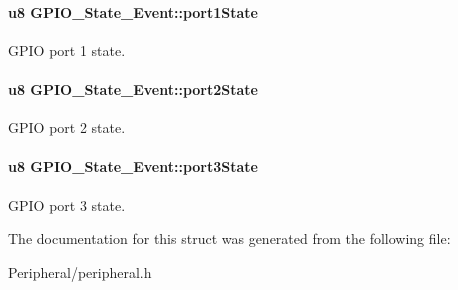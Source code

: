 \paragraph[{\texorpdfstring{port1\+State}{port1State}}]{\setlength{\rightskip}{0pt plus 5cm}u8 G\+P\+I\+O\+\_\+\+State\+\_\+\+Event\+::port1\+State}\hypertarget{struct_g_p_i_o___state___event_a133490416bcbd1d0db1d751df81be927}{}\label{struct_g_p_i_o___state___event_a133490416bcbd1d0db1d751df81be927}
G\+P\+IO port 1 state. 
\paragraph[{\texorpdfstring{port2\+State}{port2State}}]{\setlength{\rightskip}{0pt plus 5cm}u8 G\+P\+I\+O\+\_\+\+State\+\_\+\+Event\+::port2\+State}\hypertarget{struct_g_p_i_o___state___event_ab371682e22ac0d55fe6d4a019e5dd26f}{}\label{struct_g_p_i_o___state___event_ab371682e22ac0d55fe6d4a019e5dd26f}
G\+P\+IO port 2 state. 
\paragraph[{\texorpdfstring{port3\+State}{port3State}}]{\setlength{\rightskip}{0pt plus 5cm}u8 G\+P\+I\+O\+\_\+\+State\+\_\+\+Event\+::port3\+State}\hypertarget{struct_g_p_i_o___state___event_ad349a7829aa9ba5700a08be2167f9f32}{}\label{struct_g_p_i_o___state___event_ad349a7829aa9ba5700a08be2167f9f32}
G\+P\+IO port 3 state. 

The documentation for this struct was generated from the following file\+:\begin{DoxyCompactItemize}
\item 
Peripheral/peripheral.\+h\end{DoxyCompactItemize}
